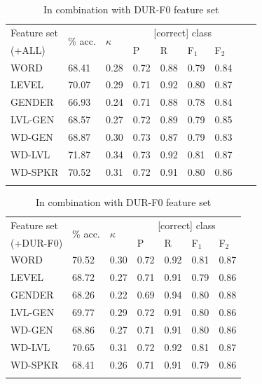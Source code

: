 		
		
		\begin{table}[htb]
			\centering
			\caption{Results of experiments with speaker and word features }
			
			\begin{subtable}{\textwidth}
			\centering
			\caption{In combination with ALL feature set}
			\begin{tabularx}{\textwidth}{lXXXXXXXX}			
			
			\toprule
			Feature set & \multirow{2}{*}{\% acc.} & \multirow{2}{*}{$\kappa$} & \multicolumn{4}{c}{[correct] class} \\
			 \cmidrule(lr){4-7}
			(+ALL)& & & P & R & F$_1$ & F$_2$ \\
			\midrule
WORD	&	68.41	&	0.28	&	0.72	&	0.88	&	0.79	&	0.84	\\
LEVEL	&	70.07	&	0.29	&	0.71	&	0.92	&	0.80	&	0.87	\\
GENDER	&	66.93	&	0.24	&	0.71	&	0.88	&	0.78	&	0.84	\\
\addlinespace													
LVL-GEN	&	68.57	&	0.27	&	0.72	&	0.89	&	0.79	&	0.85	\\
WD-GEN	&	68.87	&	0.30	&	0.73	&	0.87	&	0.79	&	0.83	\\
WD-LVL	&	71.87	&	0.34	&	0.73	&	0.92	&	0.81	&	0.87	\\		\addlinespace								
WD-SPKR	&	70.52	&	0.31	&	0.72	&	0.91	&	0.80	&	0.86	\\
			\bottomrule
			\label{tab:results:spkrword:all}
			\end{tabularx}
		\end{subtable}
		
		\begin{subtable}{\textwidth}
			\centering
			\caption{In combination with DUR-F0 feature set}
			\begin{tabularx}{\textwidth}{lXXXXXX}			
			\toprule
			Feature set & \multirow{2}{*}{\% acc.} & \multirow{2}{*}{$\kappa$} & \multicolumn{4}{c}{[correct] class} \\
			 \cmidrule(lr){4-7}
			(+DUR-F0)& & & P & R & F$_1$ & F$_2$ \\
			\midrule
WORD	&	70.52	&	0.30	&	0.72	&	0.92	&	0.81	&	0.87	\\
LEVEL	&	68.72	&	0.27	&	0.71	&	0.91	&	0.79	&	0.86	\\
GENDER	&	68.26	&	0.22	&	0.69	&	0.94	&	0.80	&	0.88	\\
\addlinespace											
LVL-GEN	&	69.77	&	0.29	&	0.72	&	0.91	&	0.80	&	0.86	\\
WD-GEN	&	68.86	&	0.27	&	0.71	&	0.91	&	0.80	&	0.86	\\
WD-LVL	&	70.65	&	0.31	&	0.72	&	0.92	&	0.81	&	0.87	\\
\addlinespace											
WD-SPKR	&	68.41	&	0.26	&	0.71	&	0.91	&	0.79	&	0.86	\\
			\bottomrule
			\label{tab:results:spkrword:durF0}
			\end{tabularx}
		\end{subtable}
		\label{tab:results:spkrword}
	\end{table}
		
